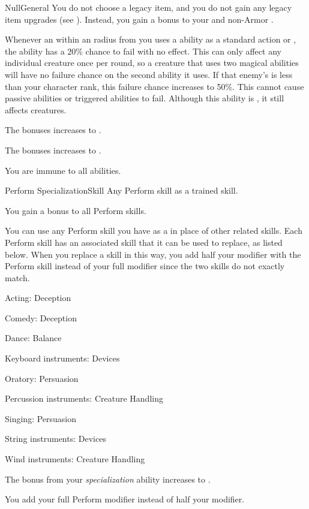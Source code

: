 \begin{feat}{Null}{General}
     You do not choose a legacy item, and you do not gain any legacy item upgrades (see ).
    Instead, you gain a  bonus to your  and non-Armor .

     Whenever an  within an \smallarea radius from you uses a \magical ability as a standard action or , the ability has a 20\% chance to fail with no effect.
    This can only affect any individual creature once per round, so a creature that uses two magical abilities will have no failure chance on the second ability it uses.
    If that enemy's  is less than your character rank, this failure chance increases to 50\%.
    This cannot cause passive abilities or triggered abilities to fail.
    Although this ability is , it still affects  creatures.

     The bonuses increases to .

     The bonuses increases to .

     You are immune to all \magical abilities.
  \end{feat}

  \begin{feat}{Perform Specialization}{Skill}
    \featpre Any Perform skill as a trained skill.

     You gain a  bonus to all Perform skills.

     You can use any Perform skill you have as a  in place of other related skills.
    Each Perform skill has an associated skill that it can be used to replace, as listed below.
    When you replace a skill in this way, you add half your modifier with the Perform skill instead of your full modifier since the two skills do not exactly match.
    \begin{raggeditemize}
      \item Acting: Deception
      \item Comedy: Deception
      \item Dance: Balance
      \item Keyboard instruments: Devices
      \item Oratory: Persuasion
      \item Percussion instruments: Creature Handling
      \item Singing: Persuasion
      \item String instruments: Devices
      \item Wind instruments: Creature Handling
    \end{raggeditemize}

     The bonus from your \textit{specialization} ability increases to .

     You add your full Perform modifier instead of half your modifier.
  \end{feat}

